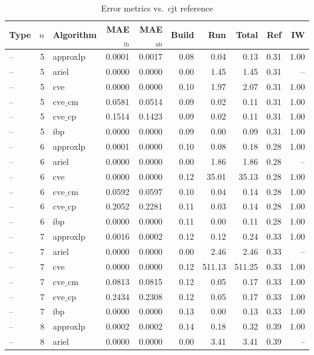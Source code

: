 \begin{table}[ht]
\centering
\scriptsize
\caption{Error metrics vs.\ cjt reference}
\begin{tabular}{lrlrrrrrrr}
\toprule
Type & $n$ & Algorithm & MAE$_{\text{lb}}$ & MAE$_{\text{ub}}$ & Build & Run & Total & Ref & IW \\
\midrule
-- & 5 & approxlp & 0.0001 & 0.0017 & 0.08 & 0.04 & 0.13 & 0.31 & 1.00 \\
-- & 5 & ariel & 0.0000 & 0.0000 & 0.00 & 1.45 & 1.45 & 0.31 & -- \\
-- & 5 & cve & 0.0000 & 0.0000 & 0.10 & 1.97 & 2.07 & 0.31 & 1.00 \\
-- & 5 & $\text{cve\_cm}$ & 0.0581 & 0.0514 & 0.09 & 0.02 & 0.11 & 0.31 & 1.00 \\
-- & 5 & $\text{cve\_cp}$ & 0.1514 & 0.1423 & 0.09 & 0.02 & 0.11 & 0.31 & 1.00 \\
-- & 5 & ibp & 0.0000 & 0.0000 & 0.09 & 0.00 & 0.09 & 0.31 & 1.00 \\
-- & 6 & approxlp & 0.0001 & 0.0000 & 0.10 & 0.08 & 0.18 & 0.28 & 1.00 \\
-- & 6 & ariel & 0.0000 & 0.0000 & 0.00 & 1.86 & 1.86 & 0.28 & -- \\
-- & 6 & cve & 0.0000 & 0.0000 & 0.12 & 35.01 & 35.13 & 0.28 & 1.00 \\
-- & 6 & $\text{cve\_cm}$ & 0.0592 & 0.0597 & 0.10 & 0.04 & 0.14 & 0.28 & 1.00 \\
-- & 6 & $\text{cve\_cp}$ & 0.2052 & 0.2281 & 0.11 & 0.03 & 0.14 & 0.28 & 1.00 \\
-- & 6 & ibp & 0.0000 & 0.0000 & 0.11 & 0.00 & 0.11 & 0.28 & 1.00 \\
-- & 7 & approxlp & 0.0016 & 0.0002 & 0.12 & 0.12 & 0.24 & 0.33 & 1.00 \\
-- & 7 & ariel & 0.0000 & 0.0000 & 0.00 & 2.46 & 2.46 & 0.33 & -- \\
-- & 7 & cve & 0.0000 & 0.0000 & 0.12 & 511.13 & 511.25 & 0.33 & 1.00 \\
-- & 7 & $\text{cve\_cm}$ & 0.0813 & 0.0815 & 0.12 & 0.05 & 0.17 & 0.33 & 1.00 \\
-- & 7 & $\text{cve\_cp}$ & 0.2434 & 0.2308 & 0.12 & 0.05 & 0.17 & 0.33 & 1.00 \\
-- & 7 & ibp & 0.0000 & 0.0000 & 0.13 & 0.00 & 0.13 & 0.33 & 1.00 \\
-- & 8 & approxlp & 0.0002 & 0.0002 & 0.14 & 0.18 & 0.32 & 0.39 & 1.00 \\
-- & 8 & ariel & 0.0000 & 0.0000 & 0.00 & 3.41 & 3.41 & 0.39 & -- \\

\end{tabular}
\end{table}
